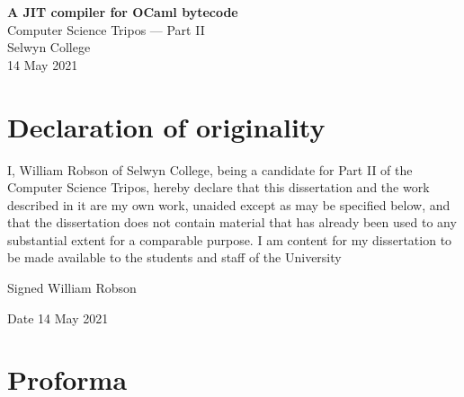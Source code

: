 
\newcommand{\thedate}{14 May 2021}

\begin{titlepage}


    \vspace*{60mm}

    \begin{center}
        \Huge
        \textbf{A JIT compiler for OCaml bytecode} \\[5mm]
        \Large
        Computer Science Tripos --- Part II \\[5mm]
        Selwyn College \\[5mm]
        \thedate
    \end{center}

    \cleardoublepage

\end{titlepage}


\section*{Declaration of originality}

I, William Robson of Selwyn College, being a candidate for Part II of the Computer Science Tripos,
hereby declare that this dissertation and the work described in it are my own work, unaided except
as may be specified below, and that the dissertation does not contain material that has already
been used to any substantial extent for a comparable purpose. I am content for my dissertation to
be
made available to the students and staff of the University

Signed William Robson

Date \thedate

\clearpage

\section*{Proforma}

